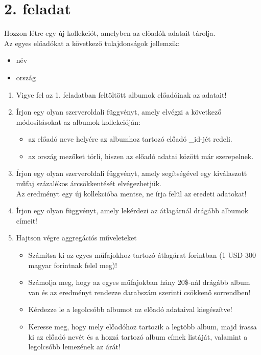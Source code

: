 \documentclass[a4paper, 12pt]{article}
\begin{document}
\section*{2. feladat}
Hozzon létre egy új kollekciót, amelyben az előadók adatait tárolja.\\
Az egyes előadókat a következő tulajdonságok jellemzik:
\begin{itemize}[noitemsep]
	\item név
	\item ország
\end{itemize}
\begin{enumerate}[label=\textbf{\alph*)}]
\item Vigye fel az 1. feladatban feltöltött albumok előadóinak az adatait!
\item Írjon egy olyan szerveroldali függvényt, amely elvégzi a következő módosításokat az albumok kollekcióján:
	  \begin{itemize}[label=-]
	  \item az előadó neve helyére az albumhoz tartozó előadó \_id-jét redeli.
	  \item az ország mezőket törli, hiszen az előadó adatai között már szerepelnek.
	  \end{itemize}
\item Írjon egy olyan szerveroldali függvényt, amely segítségével egy kiválaszott műfaj százalékos árcsökkentését elvégezhetjük.\\Az eredményt egy új kollekcióba mentse, ne írja felül az eredeti adatokat!
\item Írjon egy olyan függvényt, amely lekérdezi az átlagárnál drágább albumok címeit!
\item Hajtson végre aggregációs műveleteket
	  \begin{itemize}[label=-]
	  \item Számítsa ki az egyes műfajokhoz tartozó átlagárat forintban (1 USD 300 magyar forintnak felel meg)!
	  \item Számolja meg, hogy az egyes műfajokban hány 20\$-nál drágább album van és az eredményt rendezze darabszám szerinti csökkenő sorrendben!
	  \item Kérdezze le a legolcsóbb albumot az előadó adataival kiegészítve!
	  \item Keresse meg, hogy mely előadóhoz tartozik a legtöbb album, majd írassa ki az előadó nevét és a hozzá tartozó album címek listáját, valamint a legolcsóbb lemezének az árát!
	  \end{itemize}
\end{enumerate}
\newpage
\end{document}
